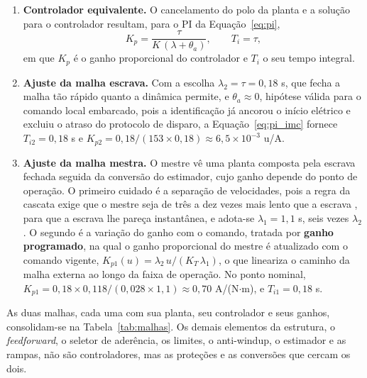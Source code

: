 \begin{enumerate}
    modelo interno compara a saída com a prevista pelo modelo $\tilde{G}$ do processo, e
    o controlador contém a inversa da parte invertível do modelo e o filtro $F$.
    \item \textbf{Controlador equivalente.} O cancelamento do polo da planta e a solução
    para o controlador resultam, para o PI da Equação~\eqref{eq:pi},
    \begin{equation}\label{eq:pi_imc}
    K_p = \frac{\tau}{K\,(\lambda + \theta_a)},
    \qquad
    T_i = \tau,
    \end{equation}
    em que $K_p$ é o ganho proporcional do controlador e $T_i$ o seu tempo integral.
    \item \textbf{Ajuste da malha escrava.} Com a escolha $\lambda_2 = \tau = 0{,}18$ s,
    que fecha a malha tão rápido quanto a dinâmica permite, e $\theta_a \approx 0$,
    hipótese válida para o comando local embarcado, pois a identificação já ancorou o
    início elétrico e excluiu o atraso do protocolo de disparo, a
    Equação~\eqref{eq:pi_imc} fornece $T_{i2} = 0{,}18$ s e $K_{p2} = 0{,}18/(153
    \times 0{,}18) \approx 6{,}5\times10^{-3}$ u/A.
    \item \textbf{Ajuste da malha mestra.} O mestre vê uma planta composta pela escrava
    fechada seguida da conversão do estimador, cujo ganho depende do ponto de operação.
    O primeiro cuidado é a separação de velocidades, pois a regra da cascata exige que o
    mestre seja de três a dez vezes mais lento que a escrava
    \cite{raffo_tcpi_cascata}, para que a escrava lhe pareça instantânea, e adota-se
    $\lambda_1 = 1{,}1$ s, seis vezes $\lambda_2$. O segundo é a variação do ganho com o
    comando, tratada por \textbf{ganho programado}, na qual o ganho proporcional do mestre
    é atualizado com o comando vigente,
    $K_{p1}(u) = \lambda_2\,u / (K_T\,\lambda_1)$, o que lineariza o caminho da malha
    externa ao longo da faixa de operação. No ponto nominal, $K_{p1} = 0{,}18 \times
    0{,}118 / (0{,}028 \times 1{,}1) \approx 0{,}70$ A/(N$\cdot$m), e
    $T_{i1} = 0{,}18$ s.
\end{enumerate}

As duas malhas, cada uma com sua planta, seu controlador e seus ganhos, consolidam-se na
Tabela~\ref{tab:malhas}. Os demais elementos da estrutura, o \emph{feedforward}, o seletor
de aderência, os limites, o anti-windup, o estimador e as rampas, não são controladores,
mas as proteções e as conversões que cercam os dois.

